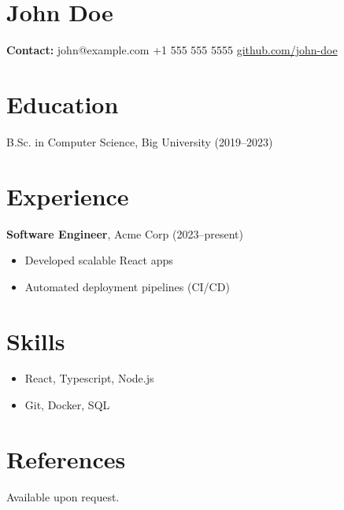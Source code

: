
\section{John Doe}
\textbf{Contact:} john@example.com \hfill +1 555 555 5555 \hfill \underline{github.com/john-doe}

\section{Education}
B.Sc. in Computer Science, Big University (2019--2023)

\section{Experience}
\textbf{Software Engineer}, Acme Corp (2023--present)
\begin{itemize}
  \item Developed scalable React apps
  \item Automated deployment pipelines (CI/CD)
\end{itemize}
\vspace{0.8em}

\section{Skills}
\begin{itemize}
  \item React, Typescript, Node.js
  \item Git, Docker, SQL
\end{itemize}

\section{References}
Available upon request.

